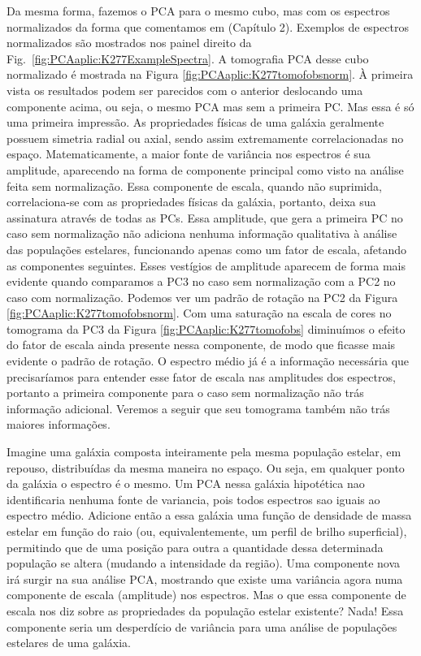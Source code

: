 Da mesma forma, fazemos o PCA para o mesmo cubo, mas com os espectros normalizados da forma que comentamos em \fixme
(Capítulo 2). Exemplos de espectros normalizados são mostrados nos painel direito da Fig.\ \ref{fig:PCAaplic:K277ExampleSpectra}.
A tomografia PCA desse cubo normalizado é mostrada na
Figura \ref{fig:PCAaplic:K277tomofobsnorm}. À primeira vista os resultados podem ser parecidos com o anterior
deslocando uma componente acima, ou seja, o mesmo PCA mas sem a primeira PC. Mas essa é só uma primeira impressão.  As
propriedades físicas de uma galáxia geralmente possuem simetria radial ou axial, sendo assim extremamente
correlacionadas no espaço. Matematicamente, a maior fonte de variância nos espectros é sua amplitude, aparecendo na
forma de componente principal como visto na análise feita sem normalização. Essa componente de escala, quando não suprimida,
correlaciona-se com as propriedades físicas da galáxia, portanto, deixa sua assinatura através de todas as PCs. Essa
amplitude, que gera a primeira PC no caso sem normalização não adiciona nenhuma informação qualitativa à análise das populações estelares,
funcionando apenas como um fator de escala, afetando as componentes seguintes. Esses vestígios de amplitude aparecem de
forma mais evidente quando comparamos a PC3 no caso sem normalização com a PC2 no caso com normalização. Podemos ver um
padrão de rotação na PC2 da Figura \ref{fig:PCAaplic:K277tomofobsnorm}. Com uma saturação na escala de cores no tomograma da
PC3 da Figura \ref{fig:PCAaplic:K277tomofobs} diminuímos o efeito do fator de escala ainda presente nessa componente, de
modo que ficasse mais evidente o padrão de rotação. O espectro médio já é a informação necessária que precisaríamos para
entender esse fator de escala nas amplitudes dos espectros, portanto a primeira componente para o caso sem normalização
não trás informação adicional. Veremos a seguir que seu tomograma também não trás maiores informações.

Imagine uma galáxia composta inteiramente pela mesma população estelar, em repouso, distribuídas da mesma maneira no
espaço. Ou seja, em qualquer ponto da galáxia o espectro é o mesmo. Um PCA nessa galáxia hipotética nao identificaria nenhuma fonte de variancia, pois todos espectros sao iguais ao espectro médio. Adicione então a essa galáxia uma função de densidade de massa estelar em função do raio (ou, equivalentemente, um perfil de brilho superficial), permitindo
que de uma posição para outra a quantidade dessa determinada população se altera (mudando a intensidade da
região). Uma componente nova irá surgir na sua análise PCA, mostrando que existe uma variância agora numa componente de
escala (amplitude) nos espectros. Mas o que essa componente de escala nos diz sobre as propriedades da população estelar
existente? Nada! Essa componente seria um desperdício de variância para uma análise de populações estelares de uma galáxia.

